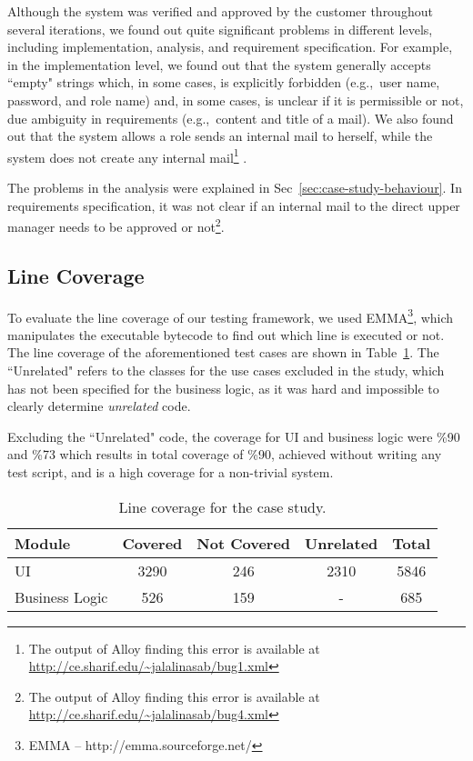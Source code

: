 Although the system was verified and approved by the customer throughout several iterations, we found out quite significant problems in different levels, including implementation, analysis, and requirement specification. For example, in the implementation level, we found out that the system generally accepts ``empty" strings  which, in some cases, is explicitly forbidden (e.g.,\ user name, password, and role name) and, in some cases, is unclear if it is permissible or not, due ambiguity in requirements (e.g.,\ content and title of a mail). We also found out that the system allows a role sends an internal mail to herself, while the system does not create any internal mail\footnote{The output of Alloy finding this error is available at \url{http://ce.sharif.edu/~jalalinasab/bug1.xml}} .

The problems in the analysis were explained in Sec~\ref{sec:case-study-behaviour}. In requirements specification, it was not clear if an internal mail to the direct upper manager needs to be approved or not\footnote{The output of Alloy finding this error is available at \url{http://ce.sharif.edu/~jalalinasab/bug4.xml}}. 

\subsection{Line Coverage}
\label{sec:case-study-line-coverage}
To evaluate the line coverage of our testing framework, we used EMMA\footnote{EMMA – http://emma.sourceforge.net/}, which manipulates the executable bytecode to find out which line is executed or not. The line coverage of the aforementioned test cases are shown in Table~\ref{tbl:case-study-coverage}. The ``Unrelated" refers to the classes for the use cases excluded in the study, which has not been specified for the business logic, as it was hard and impossible to clearly determine \textit{unrelated} code.

Excluding the ``Unrelated" code, the coverage for UI and business logic were \%90 and \%73 which results in total coverage of \%90, achieved without writing any test script, and is a high coverage for a non-trivial system.

\begin{table}[!t]
\caption{Line coverage for the case study.}
\label{tbl:case-study-coverage}
\centering
\begin{tabular}{|p{2cm}|c|c|c|c|}
\hline
Module & Covered & Not Covered & Unrelated & Total \\ \hline
UI & 3290 & 246 & 2310 & 5846 \\ \hline
Business Logic & 526	& 159 & - & 685 \\
\hline
\end{tabular}
\end{table}

